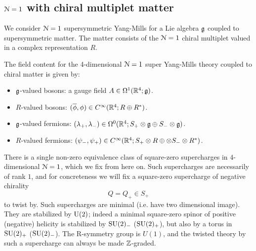 \documentclass[10pt, oneside]{article}
\begin{document}
\subsection{\texorpdfstring{$\mathcal N=1$}{N=1} with chiral multiplet matter} \label{4d_1_section}
We consider $\mathcal N=1$ supersymmetric Yang-Mills for a Lie algebra $\mathfrak g$ coupled to supersymmetric matter.
The matter consists of the $\mathcal N=1$ chiral multiplet valued in a complex representation $R$. 


The field content for the 4-dimensional $\mathcal N=1$ super Yang-Mills theory coupled to chiral matter is given by:
\begin{itemize}
\item $\mathfrak g$-valued bosons: a gauge field $A \in \Omega^1(\mathbb R^4 ; \mathfrak g)$.
\item $R$-valued bosons: $(\overline{\phi}, \phi) \in C^\infty(\mathbb R^4 ; R \oplus R^*)$.
\item $\mathfrak g$-valued fermions: $(\lambda_+, \lambda_-) \in \Omega^0(\mathbb R^4 ; S_+ \otimes \mathfrak g \oplus S_- \otimes \mathfrak g)$.
\item $R$-valued fermions: $(\psi_-,\psi_+) \in C^\infty(\mathbb R^4 ; S_+ \otimes R \oplus \otimes S_- \otimes R^*)$.
\end{itemize}

There is a single non-zero equivalence class of square-zero supercharges in $4$-dimensional $\mathcal{N} = 1$, which we fix from here on.
Such supercharges are necessarily of rank $1$, and for concreteness we will fix a square-zero supercharge of negative chirality $$Q = Q_+ \in S_+$$ to twist by. 
Such supercharges are minimal (i.e. have two dimensional image).  
They are stabilized by ${\rm U}(2)$; indeed a minimal square-zero spinor of positive (negative) helicity is stabilized by $\mathrm{SU}(2)_-$ ($\mathrm{SU}(2)_+$), but also by a torus in $\mathrm{SU}(2)_+$ ($\mathrm{SU}(2)_-$).  
The R-symmetry group is $U(1)$, and the twisted theory by such a supercharge can always be made $\mathbb Z$-graded.
\end{document}
